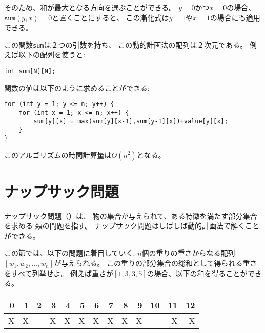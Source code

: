 そのため、和が最大となる方向を選ぶことができる。
$y=0$かつ$x=0$の場合、$\texttt{sum}(y,x)=0$と置くことにすると、
この漸化式は$y=1$や$x=1$の場合にも適用できる。

この関数\texttt{sum}は２つの引数を持ち、
この動的計画法の配列は２次元である。
例えば以下の配列を使うと:
\begin{lstlisting}
int sum[N][N];
\end{lstlisting}

関数の値は以下のように求めることができる:
\begin{lstlisting}
for (int y = 1; y <= n; y++) {
    for (int x = 1; x <= n; x++) {
        sum[y][x] = max(sum[y][x-1],sum[y-1][x])+value[y][x];
    }
}
\end{lstlisting}
このアルゴリズムの時間計算量は$O(n^2)$となる。

\begin{comment}
\section{Knapsack problems}

\index{knapsack}

The term \key{knapsack} refers to problems where
a set of objects is given, and 
subsets with some properties
have to be found.
Knapsack problems can often be solved
using dynamic programming.

In this section, we focus on the following
problem: Given a list of weights
$[w_1,w_2,\ldots,w_n]$,
determine all
sums that can be constructed using the weights.
For example, if the weights are
$[1,3,3,5]$, the following sums are possible:
\end{comment}

\section{ナップサック問題}


ナップサック問題（）は、
物の集合が与えられて、ある特徴を満たす部分集合を求める
類の問題を指す。
ナップサック問題はしばしば動的計画法で解くことができる。

この節では、以下の問題に着目していく:
$n$個の重りの重さからなる配列$[w_1,w_2,\ldots,w_n]$が与えられる。
この重りの部分集合の総和として得られる重さをすべて列挙せよ。
例えば重さが$[1,3,3,5]$の場合、以下の和を得ることができる。

\begin{center}
\begin{tabular}{rrrrrrrrrrrrr}
 0 & 1 & 2 & 3 & 4 & 5 & 6 & 7 & 8 & 9 & 10 & 11 & 12 \\
\hline
 X & X & & X & X & X & X & X & X & X & & X & X \\
\end{tabular}
\end{center}

